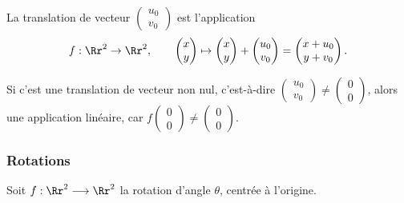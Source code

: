 \documentclass[class=report,crop=false]{standalone}
\begin{document}

\bigskip

\begin{remarque*}
La translation de vecteur $\left(\begin{smallmatrix} u_0 \\ v_0 \end{smallmatrix}\right)$
est l'application
$$f : \Rr^2 \to \Rr^2, \qquad  \begin{pmatrix}x\\y\end{pmatrix} \mapsto
\begin{pmatrix} x \\ y\end{pmatrix} + \begin{pmatrix} u_0 \\ v_0\end{pmatrix}
= \begin{pmatrix} x+u_0 \\ y+v_0\end{pmatrix}.$$

Si c'est une translation de vecteur non nul, c'est-à-dire
$\left(\begin{smallmatrix} u_0 \\ v_0 \end{smallmatrix}\right) \neq \left(\begin{smallmatrix} 0 \\ 0 \end{smallmatrix}\right)$,
alors  une application linéaire, car
$f\left(\begin{smallmatrix} 0 \\ 0 \end{smallmatrix}\right) \neq \left(\begin{smallmatrix} 0 \\ 0 \end{smallmatrix}\right)$.
\end{remarque*}


\subsubsection{Rotations}



Soit $f: \Rr^2 \longrightarrow \Rr^2$ la rotation d'angle $\theta$, centrée à l'origine.
\end{document}
